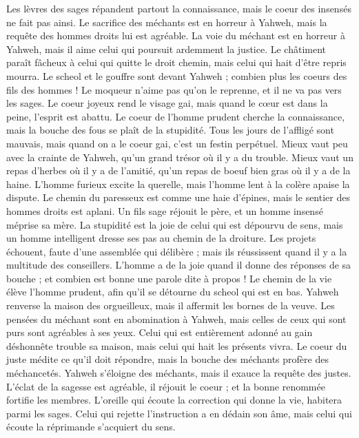 \begin{multicols}{2}
Les lèvres des sages répandent partout la connaissance, mais le coeur des insensés ne fait pas ainsi.
Le sacrifice des méchants est en horreur à Yahweh, mais la requête des hommes droits lui est agréable.
La voie du méchant est en horreur à Yahweh, mais il aime celui qui poursuit ardemment la justice.
Le châtiment paraît fâcheux à celui qui quitte le droit chemin, mais celui qui hait d'être repris mourra.
Le scheol et le gouffre sont devant Yahweh ; combien plus les coeurs des fils des hommes !
Le moqueur n'aime pas qu'on le reprenne, et il ne va pas vers les sages.
Le coeur joyeux rend le visage gai, mais quand le cœur est dans la peine, l'esprit est abattu.
Le coeur de l'homme prudent cherche la connaissance, mais la bouche des fous se plaît de la stupidité.
Tous les jours de l'affligé sont mauvais, mais quand on a le coeur gai, c'est un festin perpétuel.
Mieux vaut peu avec la crainte de Yahweh, qu'un grand trésor où il y a du trouble.
Mieux vaut un repas d'herbes où il y a de l'amitié, qu'un repas de boeuf bien gras où il y a de la haine.
L'homme furieux excite la querelle, mais l'homme lent à la colère apaise la dispute.
Le chemin du paresseux est comme une haie d’épines, mais le sentier des hommes droits est aplani.
Un fils sage réjouit le père, et un homme insensé méprise sa mère.
La stupidité est la joie de celui qui est dépourvu de sens, mais un homme intelligent dresse ses pas au chemin de la droiture.
Les projets échouent, faute d’une assemblée qui délibère ; mais ils réussissent quand il y a la multitude des conseillers.
L'homme a de la joie quand il donne des réponses de sa bouche ; et combien est bonne une parole dite à propos !
Le chemin de la vie élève l'homme prudent, afin qu'il se détourne du scheol qui est en bas.
Yahweh renverse la maison des orgueilleux, mais il affermit les bornes de la veuve.
Les pensées du méchant sont en abomination à Yahweh, mais celles de ceux qui sont purs sont agréables à ses yeux.
Celui qui est entièrement adonné au gain déshonnête trouble sa maison, mais celui qui hait les présents vivra.
Le coeur du juste médite ce qu'il doit répondre, mais la bouche des méchants profère des méchancetés.
Yahweh s’éloigne des méchants, mais il exauce la requête des justes.
L’éclat de la sagesse est agréable, il réjouit le coeur ; et la bonne renommée fortifie les membres.
L'oreille qui écoute la correction qui donne la vie, habitera parmi les sages.
Celui qui rejette l'instruction a en dédain son âme, mais celui qui écoute la réprimande s'acquiert du sens.

\end{multicols}
